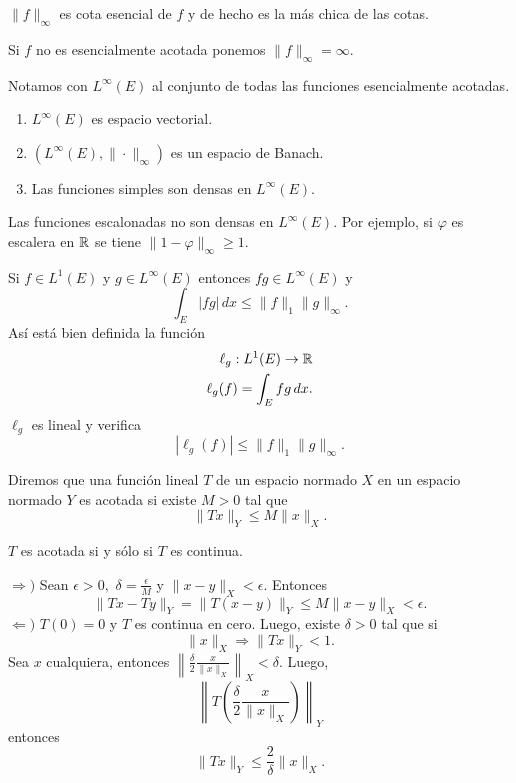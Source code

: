 \begin{ejercicio}{}
$\|f\|_{\infty}$ es cota esencial de $f$ y de hecho es la m\'as chica de las cotas.
\end{ejercicio}


Si $f$ no es esencialmente acotada ponemos $\|f\|_{\infty}=\infty$.

Notamos con $L^{\infty}(E)$ al conjunto de todas las funciones esencialmente acotadas.

\begin{ejercicio}{}
\begin{enumerate}
    \item $L^{\infty}(E)$ es espacio vectorial.
    \item $\left(L^{\infty}(E),\|\cdot\|_{\infty}\right)$ es un espacio de Banach.
    \item Las funciones simples son densas en $L^{\infty}(E)$.
\end{enumerate}
\end{ejercicio}

\begin{ejemplo}{}
Las funciones escalonadas no son densas  en $L^{\infty}(E)$. Por ejemplo, si $\varphi$ es escalera en $\mathbb{R}$ se tiene  $\|1-\varphi\|_{\infty}\geq 1$. 

 \end{ejemplo}

Si $f\in L^1(E)$ y $g \in L^{\infty}(E)$ entonces $fg\in L^{\infty}(E)$
y 
\[
\int_E |fg|\,dx \leq \|f\|_1\|g\|_{\infty}.
\]
As\'i est\'a bien definida la funci\'on 
\[
\begin{split}
\ell_g:L^1(E)\to \mathbb{R}\\
\ell_g(f)=\int_E fg\,dx.
\end{split}
\]
$\ell_g$ es lineal y verifica 
\[
|\ell_g(f)|\leq \|f\|_1 \|g\|_{\infty}.
\]

Diremos que una funci\'on lineal $T$ de un espacio normado $X$ en un espacio normado $Y$ es acotada si existe $M>0$ tal que 
\[
\|Tx\|_Y \leq M \|x\|_X.
\]

\begin{proposicion}{}
$T$ es acotada si y s\'olo si $T$ es continua.
\end{proposicion}

\begin{demo}
$\Rightarrow)$ Sean $\epsilon>0,$  $\delta=\frac{\epsilon}{M}$ y 
$\|x-y\|_X <\epsilon.$
Entonces
\[
\|Tx-Ty\|_Y = \|T(x-y)\|_Y \leq M \|x-y\|_X<\epsilon.
\]
$\Leftarrow)$ $T(0)=0$ y $T$ es continua en cero. Luego, existe $\delta>0$ tal que si 
\[
\|x\|_X \Rightarrow \|Tx\|_Y<1.
\]
Sea $x$ cualquiera, entonces $\left\|\frac{\delta}{2} \frac{x}{\|x\|_X}\right\|_X<\delta$. 
Luego, 
\[
\left\|T\left( \frac{\delta}{2} \frac{x}{\|x\|_X}   \right)\right\|_Y
\]
entonces
\[ 
\|Tx\|_Y \leq \frac{2}{\delta}\|x\|_X.
\]
\end{demo}

